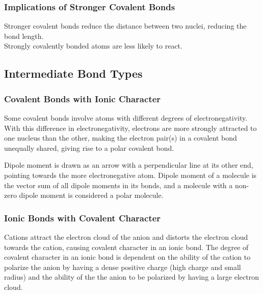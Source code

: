 \documentclass[../main]{subfiles}
\begin{document}
	\subsubsection{Implications of Stronger Covalent Bonds}

	Stronger covalent bonds reduce the distance between two nuclei, reducing the bond length. \\

	Strongly covalently bonded atoms are less likely to react.

	\subsection{Intermediate Bond Types}

	\subsubsection{Covalent Bonds with Ionic Character}

	Some covalent bonds involve atoms with different degrees of electronegativity. With this difference in electronegativity, electrons are more strongly attracted to one nucleus than the other, making the electron pair(s) in a covalent bond unequally shared, giving rise to a polar covalent bond. \\


	Dipole moment is drawn as an arrow with a perpendicular line at its other end, pointing towards the more electronegative atom. Dipole moment of a molecule is the vector sum of all dipole moments in its bonds, and a molecule with a non-zero dipole moment is considered a polar molecule.

	\subsubsection{Ionic Bonds with Covalent Character}

	Cations attract the electron cloud of the anion and distorts the electron cloud towards the cation, causing covalent character in an ionic bond. The degree of covalent character in an ionic bond is dependent on the ability of the cation to polarize the anion by having a dense positive charge (high charge and small radius) and the ability of the the anion to be polarized by having a large electron cloud. \\
\end{document}

